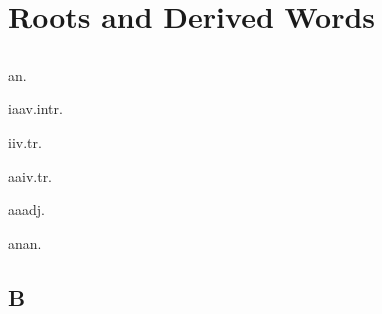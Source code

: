 
\chapter{Roots and Derived Words}
\begin{multicols*}{2}

\section*{\bigglot}

\begin{dictroot}{\bigglot}{\bigglot}
    \begin{dictentry}{{\bigglot}a\bigglot}{n.}
    \end{dictentry}
    \begin{dictentry}{i{\bigglot}aa\bigglot}{v.intr.}
    \end{dictentry}
    \begin{dictentry}{{\bigglot}ii\bigglot}{v.tr.}
    \end{dictentry}
    \begin{dictentry}{aa{\bigglot}i\bigglot}{v.tr.}
    \end{dictentry}
    \begin{dictentry}{\bigglot{}a\bigglot{}a}{adj.}
    \end{dictentry}
    \begin{dictentry}{\bigglot{}ana\bigglot}{n.}
    \end{dictentry}
\end{dictroot}

\section*{B}


\end{multicols*}
